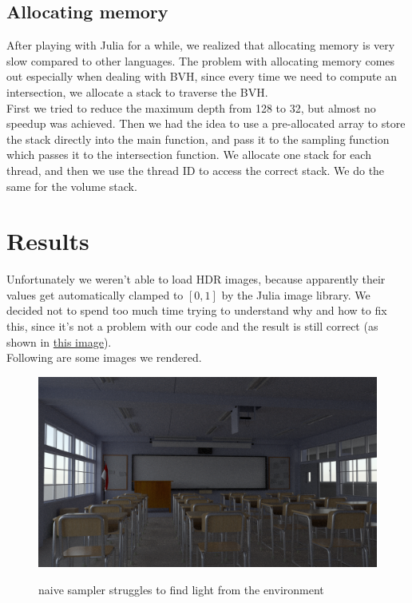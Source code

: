 \documentclass[12pt]{report}
\begin{document}
    \subsection*{Allocating memory}\label{subsec:optimizations-allocating-memory}
    After playing with Julia for a while, we realized that allocating memory is very slow compared to other languages.
    The problem with allocating memory comes out especially when dealing with BVH, since every time we need to compute
    an intersection, we allocate a stack to traverse the BVH\@.\\
    First we tried to reduce the maximum depth from 128 to 32, but almost no speedup was achieved.
    Then we had the idea to use a pre-allocated array to store the stack directly into the main function, and pass it to the
    sampling function which passes it to the intersection function.
    We allocate one stack for each thread, and then we use the thread ID to access the correct stack.
    We do the same for the volume stack.



    \section*{Results}\label{sec:results}
    Unfortunately we weren't able to load HDR images, because apparently their values get automatically clamped to
    $[0,1]$ by the Julia image library.
    We decided not to spend too much time trying to understand why and how to fix this, since it's not a problem with
    our code and the result is still correct (as shown in \hyperref[fig:livingroom1_path]{this image}).\\
    Following are some images we rendered.\\

    \begin{figure}[h]
        \caption{naive sampler struggles to find light from the environment}
        \includegraphics[width=\textwidth]{classroom_naive}
        \centering
        \label{fig:classroom_naive}
    \end{figure}
\end{document}

